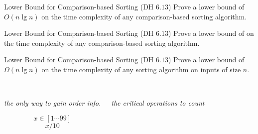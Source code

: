 
\begin{frame}{}
  \begin{center}
  \end{center}

  \pause
\end{frame}

\begin{frame}{}
  \begin{exampleblock}{Lower Bound for Comparison-based Sorting (DH $6.13$)}
    Prove a lower bound of $O(n \lg n)$ on the time complexity 
    of any comparison-based sorting algorithm.
  \end{exampleblock}

  \pause
  \vspace{-0.30cm}

  \pause
  \vspace{-0.30cm}
  \begin{exampleblock}{Lower Bound for Comparison-based Sorting (DH $6.13$)}
    Prove a lower bound of 
    on the time complexity of any comparison-based sorting 
    algorithm.
  \end{exampleblock}
\end{frame}

\begin{frame}{}
  \begin{exampleblock}{Lower Bound for Comparison-based Sorting (DH $6.13$)}
    Prove a lower bound of $\Omega(n \lg n)$
    on the time complexity of any  sorting 
    algorithm on inputs of size $n$.
  \end{exampleblock}

  \vspace{0.30cm}
  \begin{columns}
    \pause
      \begin{center}
	 \\[6pt]
	{\it the only way to gain order info.}

	\pause
	\[
	  x \in [1 \cdots 99]
	\]
	\[
	  x / 10
	\]
      \end{center}
    \pause
      \begin{center}
	 \\[6pt]
	{\it the critical operations to count}
      \end{center}

      \pause
  \end{columns}
\end{frame}

